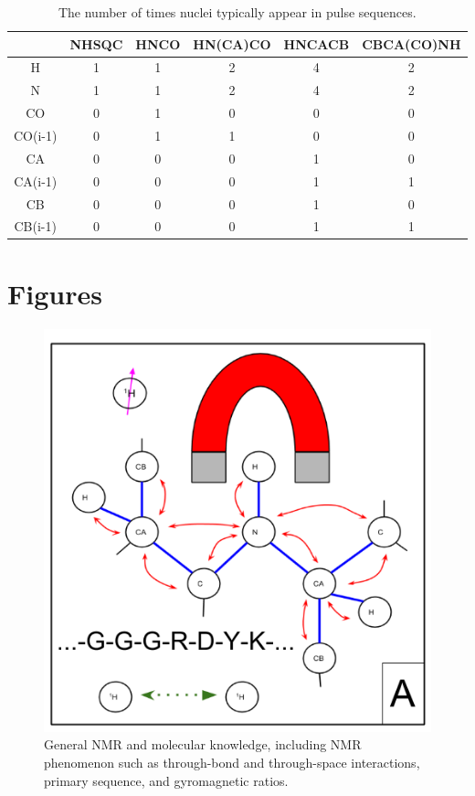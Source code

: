 \begin{table}
    \begin{tabular}{ | c || c | c | c | c | c |}
    \hline
              & NHSQC & HNCO & HN(CA)CO & HNCACB & CBCA(CO)NH \\    \hline
      H       & 1     & 1    &        2 & 4      & 2     \\    \hline
      N       & 1     & 1    &        2 & 4      & 2     \\    \hline
      CO      & 0     & 1    &        0 & 0      & 0     \\    \hline
      CO(i-1) & 0     & 1    &        1 & 0      & 0     \\    \hline
      CA      & 0     & 0    &        0 & 1      & 0     \\    \hline
      CA(i-1) & 0     & 0    &        0 & 1      & 1     \\    \hline
      CB      & 0     & 0    &        0 & 1      & 0     \\    \hline
      CB(i-1) & 0     & 0    &        0 & 1      & 1     \\    \hline
    \end{tabular}
    \caption{The number of times nuclei typically appear in pulse sequences.}
    \label{pulse_sequences}
\end{table}


\clearpage
\section{Figures}

\begin{figure}[h]
  \includegraphics[scale=0.7]{figures/data_overview_1}
  \caption[General NMR and molecular knowledge.]
          {General NMR and molecular knowledge, including NMR phenomenon
           such as through-bond and through-space interactions, primary
           sequence, and gyromagnetic ratios.}
  \label{data_overview_1}
\end{figure}

